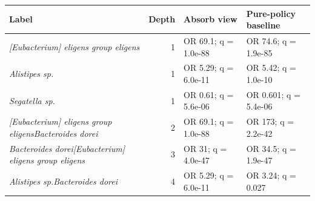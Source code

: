 \begin{center}
\scriptsize
\begin{tabularx}{\textwidth}{@{} Y r Y Y @{}}
\toprule
Label & Depth & Absorb view & Pure-policy baseline
 \\
\midrule
\emph{[Eubacterium] eligens group eligens} & 1 & OR 69.1; q = 1.0e-88 & OR 74.6; q = 1.9e-85 \\
\emph{Alistipes sp.} & 1 & OR 5.29; q = 6.0e-11 & OR 5.42; q = 1.0e-10 \\
\emph{Segatella sp.} & 1 & OR 0.61; q = 5.6e-06 & OR 0.601; q = 5.4e-06 \\
\emph{[Eubacterium] eligens group eligens}\dcstsep \emph{Bacteroides dorei} & 2 & OR 69.1; q = 1.0e-88 & OR 173; q = 2.2e-42 \\
\emph{Bacteroides dorei}\dcstsep \emph{[Eubacterium] eligens group eligens} & 3 & OR 31; q = 4.0e-47 & OR 34.5; q = 1.9e-47 \\
\emph{Alistipes sp.}\dcstsep \emph{Bacteroides dorei} & 4 & OR 5.29; q = 6.0e-11 & OR 3.24; q = 0.027 \\
\bottomrule
\end{tabularx}
\end{center}
